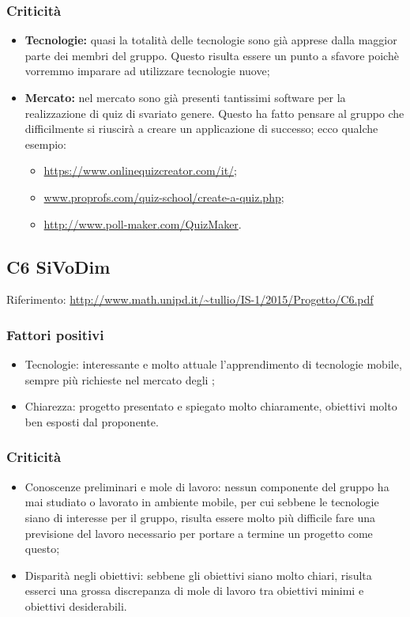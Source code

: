 \documentclass{scalatekids-article}
\begin{document}
\subsubsection{Criticità}
\begin{itemize}
\item \textbf{Tecnologie:} quasi la totalità delle tecnologie sono già apprese dalla maggior parte dei membri del gruppo. Questo risulta essere un punto a sfavore poichè vorremmo imparare ad utilizzare tecnologie nuove;
\item \textbf{Mercato:} nel mercato sono già presenti tantissimi software per la realizzazione di quiz di svariato genere. Questo ha fatto pensare al gruppo che difficilmente si riuscirà a creare un applicazione di successo; ecco qualche esempio:
  \begin{itemize}
  \item\url{https://www.onlinequizcreator.com/it/};
  \item\url{www.proprofs.com/quiz-school/create-a-quiz.php};
  \item\url{http://www.poll-maker.com/QuizMaker}.
  \end{itemize}
\end{itemize}

\subsection{C6 SiVoDim}
Riferimento: \url{http://www.math.unipd.it/~tullio/IS-1/2015/Progetto/C6.pdf}\\
\subsubsection{Fattori positivi}
\begin{itemize}
\item{Tecnologie:} interessante e molto attuale l'apprendimento di tecnologie mobile, sempre più richieste nel mercato degli ;
\item{Chiarezza:} progetto presentato e spiegato molto chiaramente, obiettivi molto ben esposti dal proponente.
\end{itemize}
\subsubsection{Criticità}
\begin{itemize}
\item{Conoscenze preliminari e mole di lavoro:} nessun componente del gruppo ha mai studiato o lavorato in ambiente mobile, per cui sebbene le tecnologie siano di interesse per il gruppo, risulta essere molto più difficile fare una previsione del lavoro necessario per portare a termine un progetto come questo;
\item{Disparità negli obiettivi:} sebbene gli obiettivi siano molto chiari, risulta esserci una grossa discrepanza di mole di lavoro tra obiettivi minimi e obiettivi desiderabili.
\end{itemize}
\end{document}
